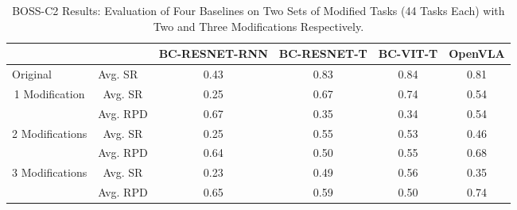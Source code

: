 \begin{table*}[ht]
\centering
\caption{BOSS-C2 Results: Evaluation of Four Baselines on Two Sets of Modified Tasks (44 Tasks Each) with Two and Three Modifications Respectively.}
\label{tb:bm2_results_appendix}
\begin{tabular}{|c|c|c|c|c|c|}
\hline
                                 &                              & BC-RESNET-RNN & BC-RESNET-T & BC-VIT-T & OpenVLA \\ \hline
\multicolumn{1}{|l|}{Original}   & \multicolumn{1}{l|}{Avg. SR} & 0.43          & 0.83        & 0.84     & 0.81    \\ \hline
\multirow{2}{*}{1 Modification}  & Avg. SR                      & 0.25          & 0.67        & 0.74     & 0.54    \\ \cline{2-6} 
                                 & Avg. RPD                      & 0.67          & 0.35        & 0.34     & 0.54    \\ \hline
\multirow{2}{*}{2 Modifications} & Avg. SR                      & 0.25          & 0.55        & 0.53     & 0.46    \\ \cline{2-6} 
                                 & Avg. RPD                      & 0.64          & 0.50        & 0.55     & 0.68    \\ \hline
\multirow{2}{*}{3 Modifications} & Avg. SR                      & 0.23          & 0.49        & 0.56     & 0.35    \\ \cline{2-6} 
                                 & Avg. RPD                      & 0.65          & 0.59        & 0.50     & 0.74    \\ \hline
\end{tabular}
\end{table*}
